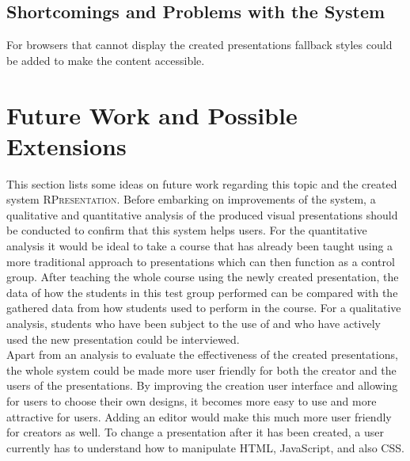 \documentclass[twoside, 12pt]{article}
\newcommand{\sys}{\textsc{RPresentation}\xspace}
\begin{document}


\subsection{Shortcomings and Problems with the System}

For browsers that cannot display the created presentations fallback styles could be added to make the content accessible.




\section{Future Work and Possible Extensions}

This section lists some ideas on future work regarding this topic and the created system \sys. Before embarking on improvements of the system, a qualitative and quantitative analysis of the produced visual presentations should be conducted to confirm that this system helps users. For the quantitative analysis it would be ideal to take a course that has already been taught using a more traditional approach to presentations which can then function as a control group. After teaching the whole course using the newly created presentation, the data of how the students in this test group performed can be compared with the gathered data from how students used to perform in the course. For a qualitative analysis, students who have been subject to the use of and who have actively used the new presentation could be interviewed.\\

Apart from an analysis to evaluate the effectiveness of the created presentations, the whole system could be made more user friendly for both the creator and the users of the presentations. By improving the creation user interface and allowing for users to choose their own designs, it becomes more easy to use and more attractive for users. Adding an editor would make this much more user friendly for creators as well. To change a presentation after it has been created, a user currently has to understand how to manipulate HTML, JavaScript, and also CSS.\\
\end{document}
